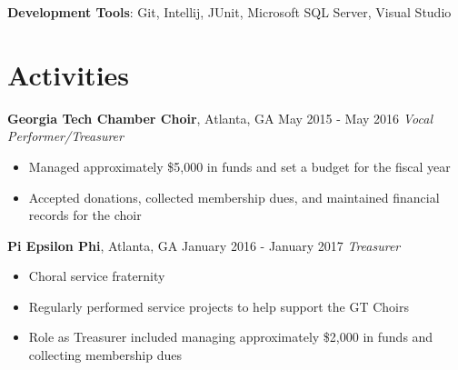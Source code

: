 \documentclass[10pt]{article}
\begin{document}
\textbf{Development Tools}: Git, Intellij, JUnit, Microsoft SQL Server, Visual Studio

\section*{Activities}
\textbf{Georgia Tech Chamber Choir}, Atlanta, GA \hfill May 2015 - May 2016
\linebreak
\textit{Vocal Performer/Treasurer}
\begin{itemize}
    \item Managed approximately \$5,000 in funds and set a budget for the fiscal year
    \item Accepted donations, collected membership dues, and maintained financial records for the choir
\end{itemize}

\vspace{3pt}

\textbf{Pi Epsilon Phi}, Atlanta, GA \hfill January 2016 - January 2017
\linebreak
\textit{Treasurer}
\begin{itemize}
    \item Choral service fraternity
    \item Regularly performed service projects to help support the GT Choirs
    \item Role as Treasurer included managing approximately \$2,000 in funds and collecting membership dues
\end{itemize}
\end{document}
